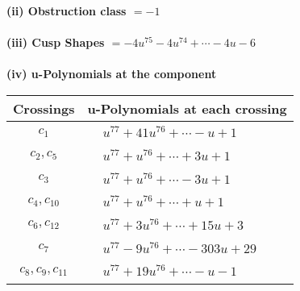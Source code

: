 \documentclass[1p]{elsarticle_modified}
\theoremstyle{definition}
\begin{document}
\flushleft \textbf{(ii) Obstruction class $= -1$}\\~\\
\flushleft \textbf{(iii) Cusp Shapes $= -4 u^{75}-4 u^{74}+\cdots-4 u-6$}\\~\\
\newpage\renewcommand{\arraystretch}{1}
\flushleft \textbf{(iv) u-Polynomials at the component}\newline \\
\begin{tabular}{m{50pt}|m{274pt}}
Crossings & \hspace{64pt}u-Polynomials at each crossing \\
\hline $$\begin{aligned}c_{1}\end{aligned}$$&$\begin{aligned}
&u^{77}+41 u^{76}+\cdots- u+1
\end{aligned}$\\
\hline $$\begin{aligned}c_{2},c_{5}\end{aligned}$$&$\begin{aligned}
&u^{77}+u^{76}+\cdots+3 u+1
\end{aligned}$\\
\hline $$\begin{aligned}c_{3}\end{aligned}$$&$\begin{aligned}
&u^{77}+u^{76}+\cdots-3 u+1
\end{aligned}$\\
\hline $$\begin{aligned}c_{4},c_{10}\end{aligned}$$&$\begin{aligned}
&u^{77}+u^{76}+\cdots+u+1
\end{aligned}$\\
\hline $$\begin{aligned}c_{6},c_{12}\end{aligned}$$&$\begin{aligned}
&u^{77}+3 u^{76}+\cdots+15 u+3
\end{aligned}$\\
\hline $$\begin{aligned}c_{7}\end{aligned}$$&$\begin{aligned}
&u^{77}-9 u^{76}+\cdots-303 u+29
\end{aligned}$\\
\hline $$\begin{aligned}c_{8},c_{9},c_{11}\end{aligned}$$&$\begin{aligned}
&u^{77}+19 u^{76}+\cdots- u-1
\end{aligned}$\\
\hline
\end{tabular}\\~\\
\end{document}
